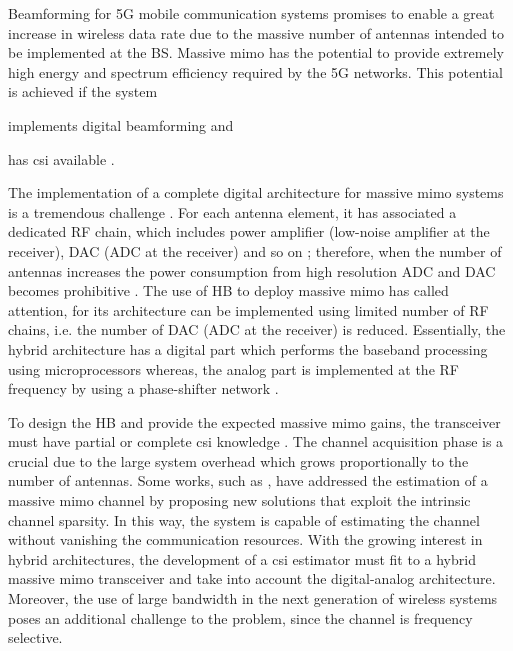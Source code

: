 \documentclass[conference]{IEEEtran}
\begin{document}
Beamforming for 5G mobile communication systems promises to enable a great
increase in wireless data rate due to the massive number of antennas intended to
be implemented at the \gls{BS}. Massive \gls{mimo} has the potential to provide
extremely high energy and spectrum efficiency required by the 5G
networks\cite{Larsson:2014}.
This potential is achieved if the system
\begin{inparaenum}[(i)]
\item implements digital beamforming and
\item has \gls{csi} available \cite{Gao:2016a}.
\end{inparaenum} 


The implementation of a complete digital architecture for massive \gls{mimo}
systems is a tremendous challenge \cite{Alkhateeb:2014}. For each antenna element, it has associated a
dedicated \gls{RF} chain, which includes power amplifier (low-noise amplifier at the
receiver), \gls{DAC} (\gls{ADC} at the receiver) and so on
\cite{Venkateswaran:2008,Alkhateeb:2014}; therefore, when the number of antennas
increases the power consumption from high resolution \gls{ADC} and \gls{DAC}
becomes prohibitive \cite{Alkhateeb:2014,Alkhateeb:2016a}. The use of \gls{HB}
to deploy massive \gls{mimo} has called attention, for its architecture can be
implemented using limited number of \gls{RF} chains, i.e. the number of \gls{DAC}
(\gls{ADC} at the receiver) is reduced. Essentially, the hybrid architecture has
a digital part which performs the baseband processing using microprocessors
whereas, the analog part is implemented at the \gls{RF} frequency by using a
phase-shifter network \cite{Heath:2016,Alkhateeb:2014,Alkhateeb:2016a}.

To design the \gls{HB} and provide the expected massive \gls{mimo} gains, the
transceiver must have partial or complete \gls{csi} knowledge
\cite{choi:2014,Heath:2016}. The channel
acquisition phase is a crucial due to the large system overhead which grows proportionally
to the number of antennas. Some works, such as
\cite{Choi:2014,Choi:2015,Gao:2015}, have addressed the estimation of a massive
\gls{mimo} channel  by proposing new solutions that exploit
the intrinsic channel sparsity. In this way, the system is capable of estimating
the channel without vanishing the communication resources. With the growing
interest in hybrid architectures, the development of a \gls{csi} estimator
must  fit to a hybrid massive \gls{mimo} transceiver and take into account the
digital-analog architecture. Moreover, the use of large bandwidth in
the next generation of wireless systems poses an additional challenge to the
problem, since the channel is frequency selective.
\end{document}
